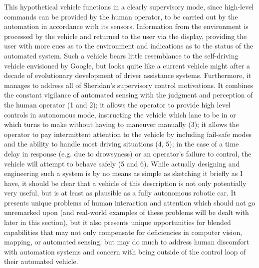 This hypothetical vehicle functions in a clearly supervisory mode,
since high-level commands can be provided by the human operator, to be
carried out by the automation in accordance with its sensors.
Information from the environment is processed by the vehicle and
returned to the user via the display, providing the user with more
cues as to the environment and indications as to the status of the
automated system. Such a vehicle bears little resemblance to the
self-driving vehicle envisioned by Google, but looks quite like a
current vehicle might after a decade of evolutionary development of
driver assistance systems. Furthermore, it manages to address all of
Sheridan's supervisory control motivations. It combines the constant
vigilance of automated sensing with the judgment and perception of the
human operator (1 and 2); it allows the operator to provide high level
controls in autonomous mode, instructing the vehicle which lane to be
in or which turns to make without having to maneuver manually (3); it
allows the operator to pay intermittent attention to the vehicle by
including fail-safe modes and the ability to handle most driving
situations (4, 5); in the case of a time delay in response (e.g. due
to drowsyness) or an
operator's failure to control, the vehicle will attempt to behave
safely (5 and 6). While actually designing and engineering such a
system is by no means as simple as sketching it briefly as I have, it
should be clear that a vehicle of this description is not only
potentially very useful, but is at least as plausible as a fully
autonomous robotic car. It presents unique problems of human
interaction and attention which should not go unremarked upon (and
real-world examples of these problems will be dealt with later in this
section), but it also presents unique opportunities for blended
capabilities that may not only compensate for deficiencies in computer
vision, mapping, or automated sensing, but may do much to address
human discomfort with automation systems and concern with being
outside of the control loop of their automated vehicle.

